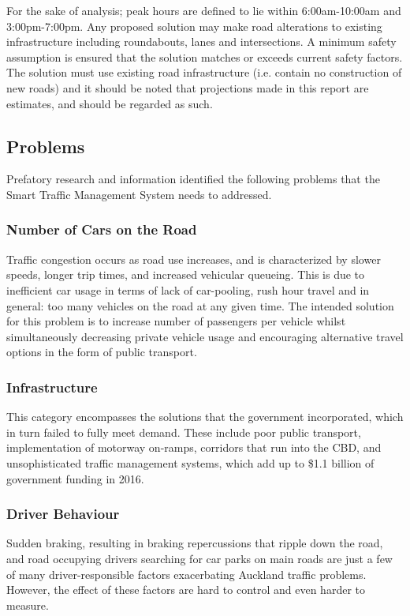 \documentclass[twoside, a4paper, 11pt]{article}
\begin{document}
For the sake of analysis; peak hours are defined to lie within 6:00am-10:00am and 3:00pm-7:00pm. Any proposed solution may make road alterations to existing infrastructure including roundabouts, lanes and intersections. A minimum safety assumption is ensured that the solution matches or exceeds current safety factors.\\

The solution must use existing road infrastructure (i.e. contain no construction of new roads) and it should be noted that projections made in this report are estimates, and should be regarded as such.
\subsection{Problems}
Prefatory research and information identified the following problems that the Smart Traffic Management System needs to addressed.
\subsubsection*{Number of Cars on the Road}
Traffic congestion occurs as road use increases, and is characterized by slower speeds, longer trip times, and increased vehicular queueing. This is due to inefficient car usage in terms of lack of car-pooling, rush hour travel and in general: too many vehicles on the road at any given time. The intended solution for this problem is to increase number of passengers per vehicle whilst simultaneously decreasing private vehicle usage and encouraging alternative travel options in the form of public transport.
\subsubsection*{Infrastructure}
This category encompasses the solutions that the government incorporated, which in turn failed to fully meet demand. These include poor public transport, implementation of motorway on-ramps, corridors that run into the CBD, and unsophisticated traffic management systems, which add up to \$1.1 billion of government funding in 2016.
\citep{nzta16}
\subsubsection*{Driver Behaviour}
Sudden braking, resulting in braking repercussions  that ripple down the road, and road occupying drivers searching for car parks on main roads are just a few of many driver-responsible factors exacerbating Auckland traffic problems. However, the effect of these factors are hard to control and even harder to measure.
\end{document}
